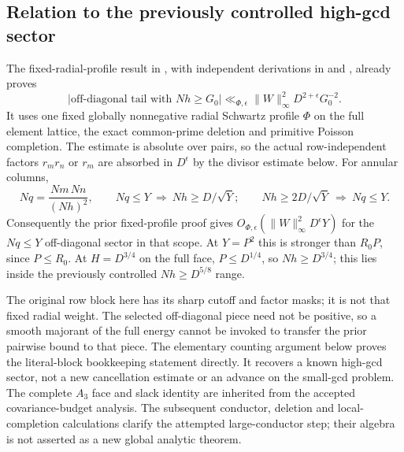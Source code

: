 \subsection{Relation to the previously controlled high-gcd sector}
The fixed-radial-profile result in
, with independent derivations in
 and
, already proves
\[
 |\text{off-diagonal tail with }Nh\ge G_0|
 \ll_{\Phi,\epsilon}\|W\|_\infty^2D^{2+\epsilon}G_0^{-2}.
\]
It uses one fixed globally nonnegative radial Schwartz profile $\Phi$
on the full element lattice, the exact common-prime deletion and
primitive Poisson completion. The estimate is absolute over pairs,
so the actual row-independent factors $r_mr_n$ or $r_m$ are absorbed
in $D^\epsilon$ by the divisor estimate below.
For annular columns,
\[
 Nq=\frac{Nm\,Nn}{(Nh)^2},\qquad
 Nq\le Y\ \Longrightarrow\ Nh\ge D/\sqrt Y;
 \qquad Nh\ge2D/\sqrt Y\ \Longrightarrow\ Nq\le Y.
\]
Consequently the prior fixed-profile proof gives
$O_{\Phi,\epsilon}(\|W\|_\infty^2D^\epsilon Y)$ for the $Nq\le Y$
off-diagonal sector in that scope. At $Y=P^2$ this is stronger than
$R_0P$, since $P\le R_0$.
At $H=D^{3/4}$ on the full face, $P\le D^{1/4}$, so
$Nh\ge D^{3/4}$; this lies inside the previously controlled
$Nh\ge D^{5/8}$ range.

The original row block here has its sharp cutoff and factor masks;
it is not that fixed radial weight. The selected off-diagonal piece
need not be positive, so a smooth majorant of the full energy cannot
be invoked to transfer the prior pairwise bound to that piece.
The elementary counting argument below proves the literal-block
bookkeeping statement directly. It recovers a known high-gcd sector,
not a new cancellation estimate or an advance on the small-gcd
problem. The complete $A_3$ face and slack identity are inherited from
the accepted covariance-budget analysis. The subsequent conductor,
deletion and local-completion calculations clarify the attempted
large-conductor step; their algebra is not asserted as a new global
analytic theorem.

